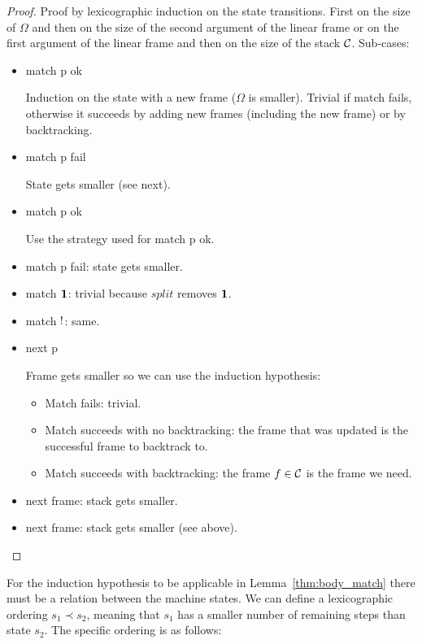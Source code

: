 \begin{proof}
   Proof by lexicographic induction on the state transitions. First on the size of
   $\Omega$ and then on the size of the second argument of the linear frame or
   on the first argument of the linear frame and then on the size of the stack
   $\mathcal{C}$.
   Sub-cases:

\begin{itemize}[leftmargin=*]
\item match p ok

Induction on the state with a new frame ($\Omega$ is smaller). Trivial if match
fails, otherwise it succeeds by adding new frames (including the new frame) or by backtracking.

\item match p fail

State gets smaller (see next).

\item match \bang p ok

Use the strategy used for match p ok.

\item match \bang p fail: state gets smaller.

\item match $\mathbf{1}$: trivial because $split$ removes $\mathbf{1}$.

\item match ${!}$: same.
\item next p

Frame gets smaller so we can use the induction hypothesis:
\begin{itemize}
   \item Match fails: trivial.
   \item Match succeeds with no backtracking: the frame that was updated is the
   successful frame to backtrack to.
   \item Match succeeds with backtracking: the frame $f \in \mathcal{C}$ is the
   frame we need.
\end{itemize}

\item next frame: stack gets smaller.
\item next \bang frame: stack gets smaller (see above).
\end{itemize}

\end{proof}


For the induction hypothesis to be applicable in Lemma~\ref{thm:body_match}
there must be a relation between the machine states.  We can define a
lexicographic ordering $s_1 \prec s_2$, meaning that $s_1$ has a smaller number
of remaining steps than state $s_2$.  The specific ordering is as follows:

